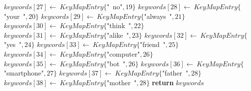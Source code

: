 \documentclass[a4paper,10pt]{article}
\begin{document}
\begin{algorithm}
\begin{algorithmic}[5]
  \State \(keywords[27]\gets\ KeyMapEntry\{\)"{}\ no"{}\(,19\}\)
  \State \(keywords[28]\gets\ KeyMapEntry\{\)"{}your\ "{}\(,20\}\)
  \State \(keywords[29]\gets\ KeyMapEntry\{\)"{}always\ "{}\(,21\}\)
  \State \(keywords[30]\gets\ KeyMapEntry\{\)"{}think\ "{}\(,22\}\)
  \State \(keywords[31]\gets\ KeyMapEntry\{\)"{}alike\ "{}\(,23\}\)
  \State \(keywords[32]\gets\ KeyMapEntry\{\)"{}yes\ "{}\(,24\}\)
  \State \(keywords[33]\gets\ KeyMapEntry\{\)"{}friend\ "{}\(,25\}\)
  \State \(keywords[34]\gets\ KeyMapEntry\{\)"{}computer"{}\(,26\}\)
  \State \(keywords[35]\gets\ KeyMapEntry\{\)"{}bot\ "{}\(,26\}\)
  \State \(keywords[36]\gets\ KeyMapEntry\{\)"{}smartphone"{}\(,27\}\)
  \State \(keywords[37]\gets\ KeyMapEntry\{\)"{}father\ "{}\(,28\}\)
  \State \(keywords[38]\gets\ KeyMapEntry\{\)"{}mother\ "{}\(,28\}\)
  \State \textbf{return} \(keywords\)
\EndFunction
\end{algorithmic}
\end{algorithm}


\State {}
\end{document}
